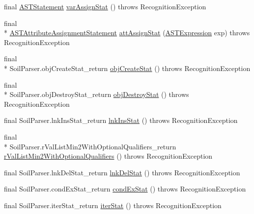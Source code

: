 \begin{DoxyCompactItemize}
\item 
final \hyperlink{classorg_1_1tzi_1_1use_1_1parser_1_1soil_1_1ast_1_1_a_s_t_statement}{A\-S\-T\-Statement} \hyperlink{classorg_1_1tzi_1_1use_1_1parser_1_1soil_1_1_soil_parser_aca9249335a508bff994fcdf869a1de78}{var\-Assign\-Stat} ()  throws Recognition\-Exception 
\item 
final \\*
\hyperlink{classorg_1_1tzi_1_1use_1_1parser_1_1soil_1_1ast_1_1_a_s_t_attribute_assignment_statement}{A\-S\-T\-Attribute\-Assignment\-Statement} \hyperlink{classorg_1_1tzi_1_1use_1_1parser_1_1soil_1_1_soil_parser_aaeed01d94e1eb5a8dd20d17312867b7a}{att\-Assign\-Stat} (\hyperlink{classorg_1_1tzi_1_1use_1_1parser_1_1ocl_1_1_a_s_t_expression}{A\-S\-T\-Expression} exp)  throws Recognition\-Exception 
\item 
final \\*
Soil\-Parser.\-obj\-Create\-Stat\-\_\-return \hyperlink{classorg_1_1tzi_1_1use_1_1parser_1_1soil_1_1_soil_parser_ac59c49548e23427ff870681a0157c25c}{obj\-Create\-Stat} ()  throws Recognition\-Exception 
\item 
final \\*
Soil\-Parser.\-obj\-Destroy\-Stat\-\_\-return \hyperlink{classorg_1_1tzi_1_1use_1_1parser_1_1soil_1_1_soil_parser_ac22a4aacb3d3d5e44f2042d08d58a118}{obj\-Destroy\-Stat} ()  throws Recognition\-Exception 
\item 
final Soil\-Parser.\-lnk\-Ins\-Stat\-\_\-return \hyperlink{classorg_1_1tzi_1_1use_1_1parser_1_1soil_1_1_soil_parser_a8d2256eac7ec50cd3ecc1c681168a021}{lnk\-Ins\-Stat} ()  throws Recognition\-Exception 
\item 
final \\*
Soil\-Parser.\-r\-Val\-List\-Min2\-With\-Optional\-Qualifiers\-\_\-return \hyperlink{classorg_1_1tzi_1_1use_1_1parser_1_1soil_1_1_soil_parser_a7963c2b77c0378741882538a1ba6b03f}{r\-Val\-List\-Min2\-With\-Optional\-Qualifiers} ()  throws Recognition\-Exception 
\item 
final Soil\-Parser.\-lnk\-Del\-Stat\-\_\-return \hyperlink{classorg_1_1tzi_1_1use_1_1parser_1_1soil_1_1_soil_parser_a199564dce5c12dbcd2c4f8c32fc1d487}{lnk\-Del\-Stat} ()  throws Recognition\-Exception 
\item 
final Soil\-Parser.\-cond\-Ex\-Stat\-\_\-return \hyperlink{classorg_1_1tzi_1_1use_1_1parser_1_1soil_1_1_soil_parser_a9785e0b9677d61405788c8655bc3ed34}{cond\-Ex\-Stat} ()  throws Recognition\-Exception 
\item 
final Soil\-Parser.\-iter\-Stat\-\_\-return \hyperlink{classorg_1_1tzi_1_1use_1_1parser_1_1soil_1_1_soil_parser_a3113d6b642635b55e7e1856b4516503f}{iter\-Stat} ()  throws Recognition\-Exception 

\end{DoxyCompactItemize}
